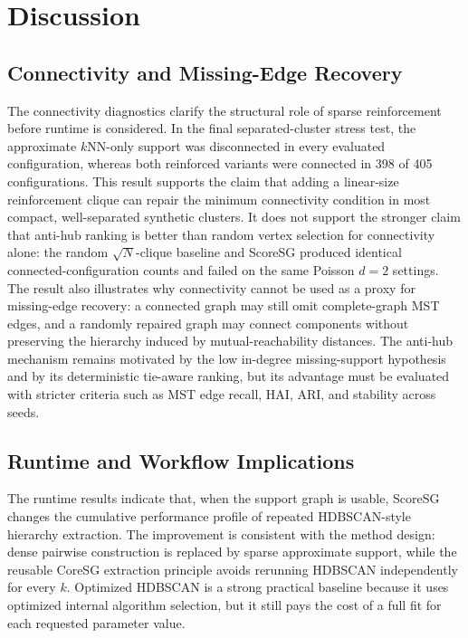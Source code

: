 \documentclass[11pt]{article}
\begin{document}
\section{Discussion}
\label{sec:discussion}

\subsection{Connectivity and Missing-Edge Recovery}

The connectivity diagnostics clarify the structural role of sparse reinforcement before runtime is considered. In the final separated-cluster stress test, the approximate \(k\)NN-only support was disconnected in every evaluated configuration, whereas both reinforced variants were connected in 398 of 405 configurations. This result supports the claim that adding a linear-size reinforcement clique can repair the minimum connectivity condition in most compact, well-separated synthetic clusters. It does not support the stronger claim that anti-hub ranking is better than random vertex selection for connectivity alone: the random \(\sqrt{N}\)-clique baseline and ScoreSG produced identical connected-configuration counts and failed on the same Poisson \(d=2\) settings. The result also illustrates why connectivity cannot be used as a proxy for missing-edge recovery: a connected graph may still omit complete-graph MST edges, and a randomly repaired graph may connect components without preserving the hierarchy induced by mutual-reachability distances. The anti-hub mechanism remains motivated by the low in-degree missing-support hypothesis and by its deterministic tie-aware ranking, but its advantage must be evaluated with stricter criteria such as MST edge recall, HAI, ARI, and stability across seeds.

\subsection{Runtime and Workflow Implications}

The runtime results indicate that, when the support graph is usable, ScoreSG changes the cumulative performance profile of repeated HDBSCAN-style hierarchy extraction. The improvement is consistent with the method design: dense pairwise construction is replaced by sparse approximate support, while the reusable CoreSG extraction principle avoids rerunning HDBSCAN independently for every \(k\). Optimized HDBSCAN is a strong practical baseline because it uses optimized internal algorithm selection, but it still pays the cost of a full fit for each requested parameter value.
\end{document}
